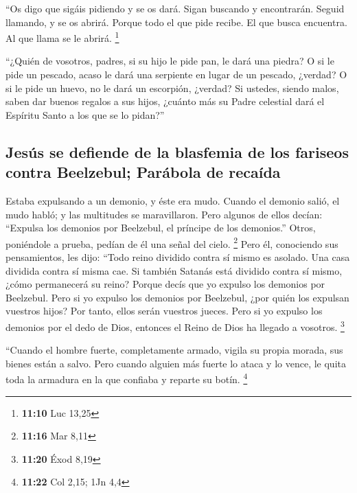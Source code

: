  ``Os digo que sigáis pidiendo y se os dará. Sigan
buscando y encontrarán. Seguid llamando, y se os abrirá. 
Porque todo el que pide recibe. El que busca encuentra. Al que llama se
le abrirá. \footnote{\textbf{11:10} Luc 13,25}

 ``¿Quién de vosotros, padres, si su hijo le pide pan, le
dará una piedra? O si le pide un pescado, acaso le dará una serpiente en
lugar de un pescado, ¿verdad?  O si le pide un huevo, no
le dará un escorpión, ¿verdad?  Si ustedes, siendo malos,
saben dar buenos regalos a sus hijos, ¿cuánto más su Padre celestial
dará el Espíritu Santo a los que se lo pidan?''

\hypertarget{jesuxfas-se-defiende-de-la-blasfemia-de-los-fariseos-contra-beelzebul-paruxe1bola-de-recauxedda}{%
\subsection{Jesús se defiende de la blasfemia de los fariseos contra
Beelzebul; Parábola de
recaída}\label{jesuxfas-se-defiende-de-la-blasfemia-de-los-fariseos-contra-beelzebul-paruxe1bola-de-recauxedda}}

 Estaba expulsando a un demonio, y éste era mudo. Cuando
el demonio salió, el mudo habló; y las multitudes se maravillaron.
 Pero algunos de ellos decían: ``Expulsa los demonios por
Beelzebul, el príncipe de los demonios.''  Otros,
poniéndole a prueba, pedían de él una señal del cielo. \footnote{\textbf{11:16}
  Mar 8,11}  Pero él, conociendo sus pensamientos, les
dijo: ``Todo reino dividido contra sí mismo es asolado. Una casa
dividida contra sí misma cae.  Si también Satanás está
dividido contra sí mismo, ¿cómo permanecerá su reino? Porque decís que
yo expulso los demonios por Beelzebul.  Pero si yo
expulso los demonios por Beelzebul, ¿por quién los expulsan vuestros
hijos? Por tanto, ellos serán vuestros jueces.  Pero si
yo expulso los demonios por el dedo de Dios, entonces el Reino de Dios
ha llegado a vosotros. \footnote{\textbf{11:20} Éxod 8,19}

 ``Cuando el hombre fuerte, completamente armado, vigila
su propia morada, sus bienes están a salvo.  Pero cuando
alguien más fuerte lo ataca y lo vence, le quita toda la armadura en la
que confiaba y reparte su botín. \footnote{\textbf{11:22} Col 2,15; 1Jn
  4,4}

